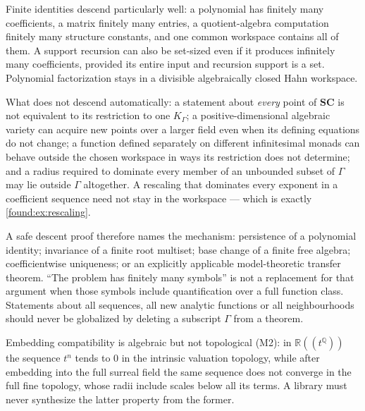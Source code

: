 \documentclass[11pt,letterpaper]{article}
\numberwithin{equation}{section}
\theoremstyle{definition}
\theoremstyle{remark}
\newcommand{\SC}{\mathbf{SC}}
\newcommand{\R}{\mathbb R}
\newcommand{\Q}{\mathbb Q}
\begin{document}
Finite identities descend particularly well: a polynomial has finitely many
coefficients, a matrix finitely many entries, a quotient-algebra computation
finitely many structure constants, and one common workspace contains all of
them. A support recursion can also be set-sized even if it produces infinitely
many coefficients, provided its entire input and recursion support is a set.
Polynomial factorization stays in a divisible algebraically closed Hahn
workspace.

What does not descend automatically: a statement about \emph{every} point of
$\SC$ is not equivalent to its restriction to one $K_\Gamma$; a
positive-dimensional algebraic variety can acquire new points over a larger
field even when its defining equations do not change; a function defined
separately on different infinitesimal monads can behave outside the chosen
workspace in ways its restriction does not determine; and a radius required to
dominate every member of an unbounded subset of $\Gamma$ may lie outside
$\Gamma$ altogether. A rescaling that dominates every exponent in a coefficient
sequence need not stay in the workspace --- which is exactly
\cref{found:ex:rescaling}.

A safe descent proof therefore names the mechanism: persistence of a polynomial
identity; invariance of a finite root multiset; base change of a finite free
algebra; coefficientwise uniqueness; or an explicitly applicable
model-theoretic transfer theorem. ``The problem has finitely many symbols'' is
not a replacement for that argument when those symbols include quantification
over a full function class. Statements about all sequences, all new analytic
functions or all neighbourhoods should never be globalized by deleting a
subscript $\Gamma$ from a theorem.

Embedding compatibility is algebraic but not topological (M2): in
$\R((t^\Q))$ the sequence $t^n$ tends to $0$ in the intrinsic valuation
topology, while after embedding into the full surreal field the same sequence
does not converge in the full fine topology, whose radii include scales below
all its terms. A library must never synthesize the latter property from the
former.
\end{document}

